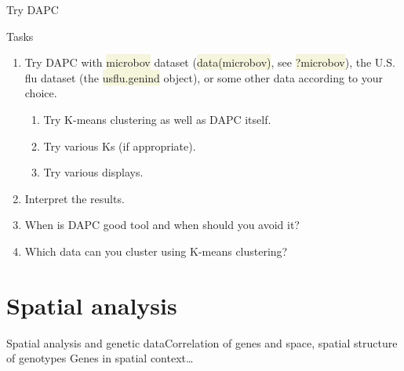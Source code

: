 \documentclass[compress, xelatex, 11pt, xcolor=svgnames, aspectratio=169,
	hyperref={
		bookmarks=true,
		unicode=true,
		colorlinks=true,
		pdftitle={Molecular data in R},
		plainpages=false,
		pdfauthor={Vojtech Zeisek},
		pdfsubject={Course about phylogeny and evolution in R},
		pdfcreator={XeLaTeX},
		pdfkeywords={R, evolution, phylogeny, molecular data},
		linkcolor=Crimson, %
		anchorcolor=Magenta, %
		citecolor=Magenta, %
		filecolor=Magenta, %
		menucolor=Magenta, %
		urlcolor=DodgerBlue, %
		},
	url={hyphens, lowtilde} %
	]{beamer}
\renewcommand{\texttt}[1]{\colorbox{Beige}{{\ttfamily #1}}}
\begin{document}
\begin{frame}{Try DAPC}
	\begin{exampleblock}{Tasks}
		\begin{enumerate}
			\item Try DAPC with \texttt{microbov} dataset (\texttt{data(microbov)}, see \texttt{?microbov}), the U.S. flu dataset (the \texttt{usflu.genind} object), or some other data according to your choice.
			\begin{enumerate}
				\item Try K-means clustering as well as DAPC itself.
				\item Try various Ks (if appropriate).
				\item Try various displays.
			\end{enumerate}
			\item Interpret the results.
			\item When is DAPC good tool and when should you avoid it?
			\item Which data can you cluster using K-means clustering?
		\end{enumerate}
	\end{exampleblock}
\end{frame}

\section{Spatial analysis}

\begin{frame}[fragile]{Spatial analysis and genetic data}{Correlation of genes and space, spatial structure of genotypes}
	Genes in spatial context\ldots
	\tableofcontents[currentsection, sectionstyle=show/hide, hideothersubsections]
\end{frame}
\end{document}
